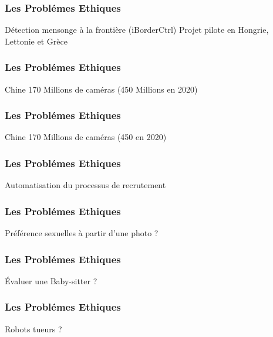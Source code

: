 \documentclass{formation}
\begin{document}
\begin{frame}
  \frametitle{Les Problémes Ethiques}
  Détection mensonge à la frontière (iBorderCtrl)
  \newline
  Projet pilote en Hongrie, Lettonie et Grèce
\end{frame}

\begin{frame}
  \frametitle{Les Problémes Ethiques}
  Chine 170 Millions de caméras (450 Millions en 2020)
  \begin{minipage}[c]{0.49\linewidth}
  \end{minipage}\hfill
  \begin{minipage}[c]{0.49\linewidth}
  \end{minipage}\hfill
\end{frame}

\begin{frame}
  \frametitle{Les Problémes Ethiques}
  Chine 170 Millions de caméras (450 en 2020)
\end{frame}

\begin{frame}
  \frametitle{Les Problémes Ethiques}
  Automatisation du processus de recrutement
\end{frame}

\begin{frame}
  \frametitle{Les Problémes Ethiques}
  Préférence sexuelles à partir d'une photo ?
\end{frame}

\begin{frame}
  \frametitle{Les Problémes Ethiques}
  Évaluer une Baby-sitter ?
\end{frame}

\begin{frame}
  \frametitle{Les Problémes Ethiques}
  Robots tueurs ? 
\end{frame}
\end{document}
